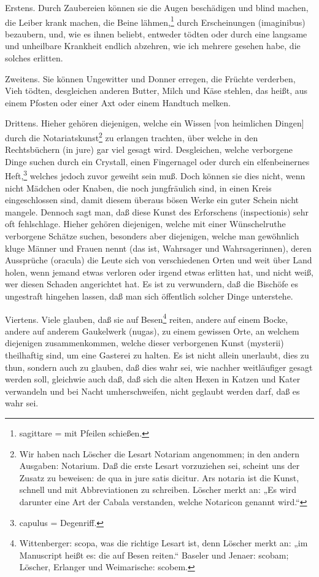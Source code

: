 Erstens. Durch Zaubereien können sie die Augen beschädigen und blind machen, die Leiber krank machen, die Beine lähmen,\footnote{sagittare = mit Pfeilen schießen.} durch Erscheinungen (imaginibus) bezaubern, und, wie es ihnen beliebt, entweder tödten oder durch eine langsame und unheilbare Krankheit endlich abzehren, wie ich mehrere gesehen habe, die solches erlitten.

Zweitens. Sie können Ungewitter und Donner erregen, die Früchte verderben, Vieh tödten, desgleichen anderen Butter, Milch und Käse stehlen, das heißt, aus einem Pfosten oder einer Axt oder einem Handtuch melken.

Drittens. Hieher gehören diejenigen, welche ein Wissen [von heimlichen Dingen] durch die Notariatskunst\footnote{Wir haben nach Löscher die Lesart Notariam angenommen; in den andern Ausgaben: Notarium. Daß die erste Lesart vorzuziehen sei, scheint uns der Zusatz zu beweisen: de qua in jure satis dicitur. Ars notaria ist die Kunst, schnell und mit Abbreviationen zu schreiben. Löscher merkt an: „Es wird darunter eine Art der Cabala verstanden, welche Notaricon genannt wird.“} zu erlangen trachten, über welche in den Rechtsbüchern (in jure) gar viel gesagt wird. Desgleichen, welche verborgene Dinge suchen durch ein Crystall, einen Fingernagel oder durch ein elfenbeinernes Heft,\footnote{capulus = Degenriff.} welches jedoch zuvor geweiht sein muß. Doch können sie dies nicht, wenn nicht Mädchen oder Knaben, die noch jungfräulich sind, in einen Kreis eingeschlossen sind, damit diesem überaus bösen Werke ein guter Schein nicht mangele. Dennoch sagt man, daß diese Kunst des Erforschens (inspectionis) sehr oft fehlschlage. Hieher gehören diejenigen, welche mit einer Wünschelruthe verborgene Schätze suchen, besonders aber diejenigen, welche man gewöhnlich kluge Männer und Frauen nennt (das ist, Wahrsager und Wahrsagerinnen), deren Aussprüche (oracula) die Leute sich von verschiedenen Orten und weit über Land holen, wenn jemand etwas verloren oder irgend etwas erlitten hat, und nicht weiß, wer diesen Schaden angerichtet hat. Es ist zu verwundern, daß die Bischöfe es ungestraft hingehen lassen, daß man sich öffentlich solcher Dinge unterstehe.

Viertens. Viele glauben, daß sie auf Besen\footnote{Wittenberger: scopa, was die richtige Lesart ist, denn Löscher merkt an: „im Manuscript heißt es: die auf Besen reiten.“ Baseler und Jenaer: scobam; Löscher, Erlanger und Weimarische: scobem.} reiten, andere auf einem Bocke, andere auf anderem Gaukelwerk (nugas), zu einem gewissen Orte, an welchem diejenigen zusammenkommen, welche dieser verborgenen Kunst (mysterii) theilhaftig sind, um eine Gasterei zu halten. Es ist nicht allein unerlaubt, dies zu thun, sondern auch zu glauben, daß dies wahr sei, wie nachher weitläufiger gesagt werden soll, gleichwie auch daß,
daß sich die alten Hexen in Katzen und Kater verwandeln und bei Nacht umherschweifen, nicht geglaubt werden darf, daß es wahr sei.

